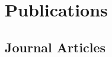 \documentclass[11pt,letterpaper]{report}
\begin{document}
    \section*{Publications}

    \subsection*{Journal Articles}

    \begin{tablist}







\end{tablist}
\end{document}
